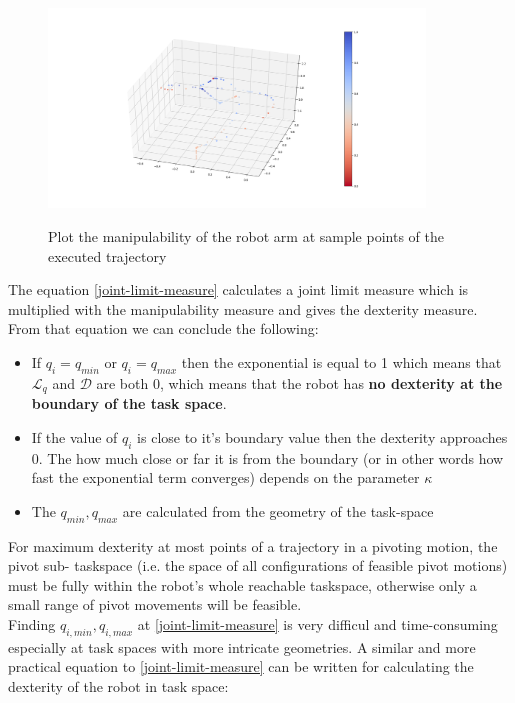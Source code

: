 \begin{center}
\begin{figure}[H]
\centering
\includegraphics[width=10cm]{images/robot-planner1-manipulability-plot.png}\\
\caption{Plot the manipulability of the robot arm at sample points of the executed trajectory}
\end{figure}
\end{center}

The equation \ref{joint-limit-measure} calculates a joint limit measure which is multiplied with the manipulability measure and gives the dexterity measure.
From that equation we can conclude the following:
\begin{itemize}
\item If $q_i = q_{min}$ or $q_i = q_{max}$ then the exponential is equal to 1 which means that $\mathcal{L}_{q}$ and $\mathcal{D}$ are both 0, which means 
that the robot has \textbf{no dexterity at the boundary of the task space}.
\item If the value of $q_i$ is close to it's boundary value then the dexterity approaches 0. The how much close or far it is from the boundary (or in other words 
how fast the exponential term converges) depends on the parameter $\kappa$
\item The $q_{min}, q_{max}$ are calculated from the geometry of the task-space
\end{itemize}

For maximum dexterity at most points of a trajectory in a pivoting motion, the pivot sub-
taskspace (i.e. the space of all configurations of feasible pivot motions) must be fully within 
the robot’s whole reachable taskspace, otherwise only a small range of pivot movements will be 
feasible.\\

Finding $q_{i,min}, q_{i,max}$ at \ref{joint-limit-measure} is very difficul and time-consuming especially at task spaces with more intricate geometries. 
A similar and more practical equation to \ref{joint-limit-measure} can be written for calculating the dexterity of the robot in task space:

